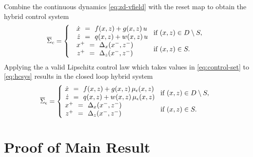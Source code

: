 \documentclass[twocolumn]{article}
\begin{document}
Combine the continuous dynamics \eqref{eq:zd-vfield} with the reset map to obtain the hybrid control system
\begin{align}
  \label{eq:hcsys}
        \HCSbar= \left\{
        \begin{array}{l l}
          \begin{array}{r c l}
            {\dot \zdx} &\!\!=\!\!& f(\zdx, \zdz) + g(\zdx, \zdz) \, u\\
            {\dot \zdz} &\!\!=\!\!& q(\zdx, \zdz) + w(\zdx, \zdz) \, u
          \end{array} \!\! & \!\! \mbox{if } (\zdx, \zdz) \in \D \setminus \S,\\
          \begin{array}{r c l}
            \zdx^{+} &\!\!=\!\!& \Delta_{\zdx}(\zdx^{-}, \zdz^{-})\\
            \zdz^{+} &\!\!=\!\!& \Delta_{\zdz}(\zdx^{-}, \zdz^{-})
          \end{array} \!\! & \!\! \mbox{if } (\zdx, \zdz) \in \S.
        \end{array}\right.
\end{align}
%
Applying the a valid Lipschitz control law which takes values in \eqref{eq:control-set} to \eqref{eq:hcsys} results in the closed loop hybrid system
%
\begin{align}
  \label{eq:hsys-cl}
        \HSbar_{\epsilon} = \left\{\!\!\!\!
        \begin{array}{l l}
          \begin{array}{r c l}
            {\dot \zdx} &\!\!=\!\!& f(\zdx, \zdz) + g(\zdx, \zdz) \, \mueps(\zdx, \zdz)\\
            {\dot \zdz} &\!\!=\!\!& q(\zdx, \zdz) + w(\zdx, \zdz) \, \mueps(\zdx, \zdz)
          \end{array} \!\! & \!\! \mbox{if } (\zdx, \zdz) \in \D \setminus \S,\\
          \begin{array}{r c l}
            \zdx^{+} &\!\!=\!\!& \Delta_{\zdx}(\zdx^{-}, \zdz^{-})\\
            \zdz^{+} &\!\!=\!\!& \Delta_{\zdz}(\zdx^{-}, \zdz^{-})
          \end{array} \!\! & \!\! \mbox{if } (\zdx, \zdz) \in \S.
        \end{array}\right.
\end{align}

\section{Proof of Main Result}
\end{document}
